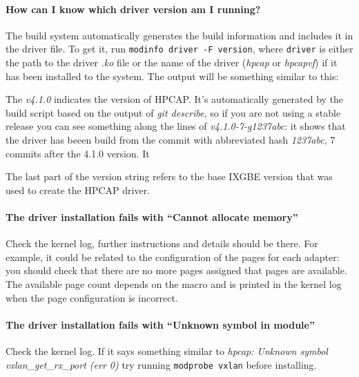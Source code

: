 \documentclass[a4paper,oneside]{hpman}
\begin{document}
\paragraph{How can I know which driver version am I running?}
    The build system automatically generates the build information and includes it in the driver file. To get it, run \texttt{modinfo driver -F version}, where \texttt{driver} is either the path to the driver \textit{.ko} file or the name of the driver (\textit{hpcap} or \textit{hpcapvf}) if it has been installed to the system. The output will be something similar to this:

    \vspace{3pt}
    \vspace{3pt}

    The \textit{v4.1.0} indicates the version of HPCAP. It's automatically generated by the build script based on the output of \textit{git describe}, so if you are not using a stable release you can see something along the lines of \textit{v4.1.0-7-g1237abc}: it shows that the driver has beeen build from the commit with abbreviated hash \textit{1237abc}, 7 commits after the 4.1.0 version. It

    The last part of the version string refers to the base IXGBE version that was used to create the HPCAP driver.

\paragraph{The driver installation fails with ``Cannot allocate memory''}
    Check the kernel log, further instructions and details should be there. For example, it could be related to the configuration of the pages for each adapter: you should check that there are no more pages assigned that pages are available. The available page count depends on the  macro and is printed in the kernel log when the page configuration is incorrect.

\paragraph{The driver installation fails with ``Unknown symbol in module''}
    Check the kernel log. If it says something similar to \textit{hpcap: Unknown symbol vxlan\_get\_rx\_port (err 0)} try running \texttt{modprobe vxlan} before installing.
\end{document}
